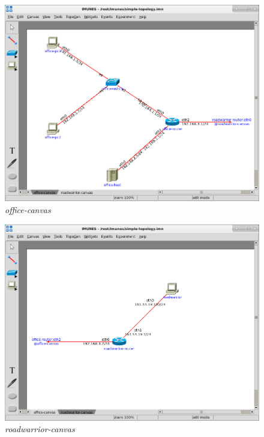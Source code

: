 \begin{figure}[H]
    \centering
    \includegraphics[width=\textwidth]{./images/office_canvas.png}
    \caption{\emph{office-canvas}}
    \label{fig:office_canvas}
\end{figure}

\begin{figure}[H]
    \centering
    \includegraphics[width=\textwidth]{./images/roadwarrior_canvas.png}
    \caption{\emph{roadwarrior-canvas}}
    \label{fig:roadwarrior_canvas}
\end{figure}
 

